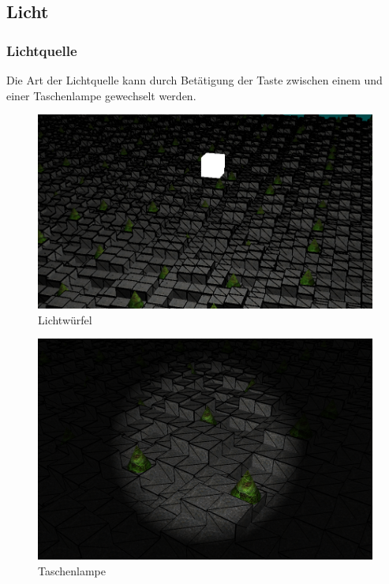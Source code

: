 \documentclass{article}
\begin{document}
\subsection{Licht}
\subsubsection{Lichtquelle}
Die Art der Lichtquelle kann durch Betätigung der Taste  zwischen einem  und einer
Taschenlampe gewechselt werden.\\
\begin{minipage}{0.55\textwidth}
\begin{figure}[H]
    \includegraphics[scale=0.258]{lmode1.png}
    \caption{Lichtwürfel}
\end{figure}
\end{minipage}
\begin{minipage}{0.45\textwidth}
\begin{figure}[H]
    \includegraphics[scale=0.145]{lmode2.png}
    \caption{Taschenlampe}
\end{figure}
\end{minipage}
\end{document}
